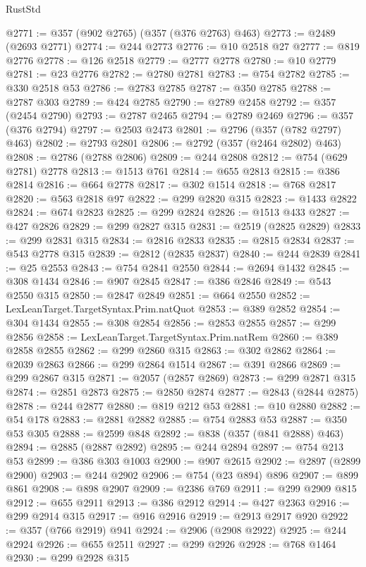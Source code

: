 \begin{lexlean}{RustStd}
\begin{coremodule}
@2771 := @357 (@902 @2765) (@357 (@376 @2763) @463)
@2773 := @2489 (@2693 @2771)
@2774 := @244 @2773
@2776 := @10 @2518 @27
@2777 := @819 @2776
@2778 := @126 @2518
@2779 := @2777 @2778
@2780 := @10 @2779
@2781 := @23 @2776
@2782 := @2780 @2781
@2783 := @754 @2782
@2785 := @330 @2518 @53
@2786 := @2783 @2785
@2787 := @350 @2785
@2788 := @2787 @303
@2789 := @424 @2785
@2790 := @2789 @2458
@2792 := @357 (@2454 @2790)
@2793 := @2787 @2465
@2794 := @2789 @2469
@2796 := @357 (@376 @2794)
@2797 := @2503 @2473
@2801 := @2796 (@357 (@782 @2797) @463)
@2802 := @2793 @2801
@2806 := @2792 (@357 (@2464 @2802) @463)
@2808 := @2786 (@2788 @2806)
@2809 := @244 @2808
@2812 := @754 (@629 @2781) @2778
@2813 := @1513 @761
@2814 := @655 @2813
@2815 := @386 @2814
@2816 := @664 @2778
@2817 := @302 @1514
@2818 := @768 @2817
@2820 := @563 @2818 @97
@2822 := @299 @2820 @315
@2823 := @1433 @2822
@2824 := @674 @2823
@2825 := @299 @2824
@2826 := @1513 @433
@2827 := @427 @2826
@2829 := @299 @2827 @315
@2831 := @2519 (@2825 @2829)
@2833 := @299 @2831 @315
@2834 := @2816 @2833
@2835 := @2815 @2834
@2837 := @543 @2778 @315
@2839 := @2812 (@2835 @2837)
@2840 := @244 @2839
@2841 := @25 @2553
@2843 := @754 @2841 @2550
@2844 := @2694 @1432
@2845 := @308 @1434
@2846 := @907 @2845
@2847 := @386 @2846
@2849 := @543 @2550 @315
@2850 := @2847 @2849
@2851 := @664 @2550
@2852 := LexLeanTarget.TargetSyntax.Prim.natQuot
@2853 := @389 @2852
@2854 := @304 @1434
@2855 := @308 @2854
@2856 := @2853 @2855
@2857 := @299 @2856
@2858 := LexLeanTarget.TargetSyntax.Prim.natRem
@2860 := @389 @2858 @2855
@2862 := @299 @2860 @315
@2863 := @302 @2862
@2864 := @2039 @2863
@2866 := @299 @2864 @1514
@2867 := @391 @2866
@2869 := @299 @2867 @315
@2871 := @2057 (@2857 @2869)
@2873 := @299 @2871 @315
@2874 := @2851 @2873
@2875 := @2850 @2874
@2877 := @2843 (@2844 @2875)
@2878 := @244 @2877
@2880 := @819 @212 @53
@2881 := @10 @2880
@2882 := @54 @178
@2883 := @2881 @2882
@2885 := @754 @2883 @53
@2887 := @350 @53 @305
@2888 := @2599 @848
@2892 := @838 (@357 (@841 @2888) @463)
@2894 := @2885 (@2887 @2892)
@2895 := @244 @2894
@2897 := @754 @213 @53
@2899 := @386 @303 @1003
@2900 := @907 @2615
@2902 := @2897 (@2899 @2900)
@2903 := @244 @2902
@2906 := @754 (@23 @894) @896
@2907 := @899 @861
@2908 := @898 @2907
@2909 := @2386 @769
@2911 := @299 @2909 @815
@2912 := @655 @2911
@2913 := @386 @2912
@2914 := @427 @2363
@2916 := @299 @2914 @315
@2917 := @916 @2916
@2919 := @2913 @2917 @920
@2922 := @357 (@766 @2919) @941
@2924 := @2906 (@2908 @2922)
@2925 := @244 @2924
@2926 := @655 @2511
@2927 := @299 @2926
@2928 := @768 @1464
@2930 := @299 @2928 @315

\end{coremodule}
\end{lexlean}
